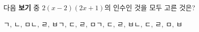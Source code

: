 다음 \textbf{보기} 중 $2(x-2)(2x+1)$의 인수인 것을 모두 고른 것은?
\begin{choicesii}{ㄱ, ㄴ, ㅁ}{ㄴ, ㄹ, ㅂ}{ㄱ, ㄷ, ㄹ, ㅁ}{ㄱ, ㄷ, ㄹ, ㅂ}{ㄴ, ㄷ, ㄹ, ㅁ, ㅂ}\end{choicesii}
